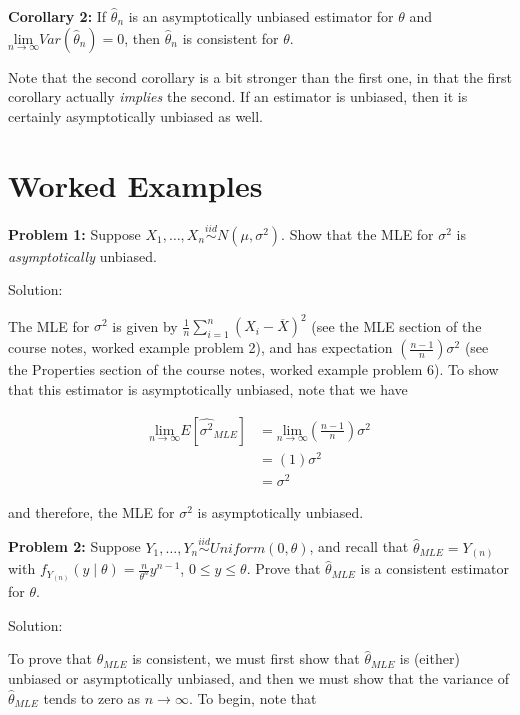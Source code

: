 \documentclass[
  letterpaper,
  DIV=11,
  numbers=noendperiod]{scrreprt}
\begin{document}
\textbf{Corollary 2:} If \(\hat{\theta}_n\) is an asymptotically
unbiased estimator for \(\theta\) and
\(\underset{n \to \infty}{\text{lim}} Var(\hat{\theta}_n) = 0\), then
\(\hat{\theta}_n\) is consistent for \(\theta\).

Note that the second corollary is a bit stronger than the first one, in
that the first corollary actually \emph{implies} the second. If an
estimator is unbiased, then it is certainly asymptotically unbiased as
well.

\section{Worked Examples}\label{worked-examples-4}

\textbf{Problem 1:} Suppose
\(X_1, \dots, X_n \overset{iid}{\sim} N(\mu, \sigma^2)\). Show that the
MLE for \(\sigma^2\) is \emph{asymptotically} unbiased.

Solution:

The MLE for \(\sigma^2\) is given by
\(\frac{1}{n} \sum_{i = 1}^n (X_i - \overline{X})^2\) (see the MLE
section of the course notes, worked example problem 2), and has
expectation \(\left( \frac{n-1}{n} \right)\sigma^2\) (see the Properties
section of the course notes, worked example problem 6). To show that
this estimator is asymptotically unbiased, note that we have

\begin{align*}
    \underset{n\to \infty}{\text{lim}} E[\hat{\sigma^2}_{MLE}] & = \underset{n\to \infty}{\text{lim}} \left( \frac{n-1}{n} \right) \sigma^2 \\
    & = \left( 1 \right) \sigma^2 \\
    & = \sigma^2
\end{align*}

and therefore, the MLE for \(\sigma^2\) is asymptotically unbiased.

\textbf{Problem 2:} Suppose
\(Y_1, \dots, Y_n \overset{iid}{\sim} Uniform(0, \theta)\), and recall
that \(\hat{\theta}_{MLE} = Y_{(n)}\) with
\(f_{Y_{(n)}}(y \mid \theta) = \frac{n}{\theta^n} y^{n-1}\),
\(0 \leq y \leq \theta\). Prove that \(\hat{\theta}_{MLE}\) is a
consistent estimator for \(\theta\).

Solution:

To prove that \(\hat{\theta}_{MLE}\) is consistent, we must first show
that \(\hat{\theta}_{MLE}\) is (either) unbiased or asymptotically
unbiased, and then we must show that the variance of
\(\hat{\theta}_{MLE}\) tends to zero as \(n \to \infty\). To begin, note
that
\end{document}
